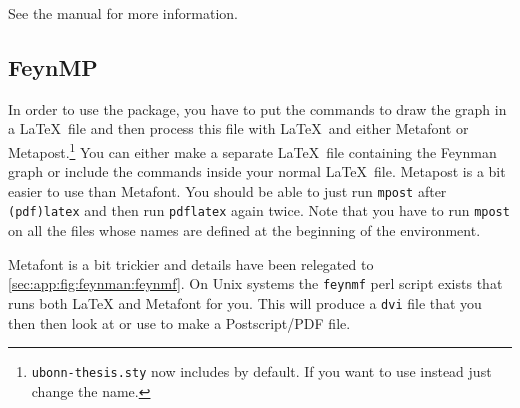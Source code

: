 See the  manual for more information.

\subsection{FeynMP}%
\label{sec:fig:feynman:feynmp}

In order to use the  package, you have to put
the commands to draw the graph in a \LaTeX\ file and then process
this file with \LaTeX\ and either Metafont or
Metapost.\footnote{\texttt{ubonn-thesis.sty} now includes 
  by default.
  If you want to use  instead just change the name.} 
You can either make
a separate \LaTeX\ file containing the Feynman graph or include the
commands inside your normal \LaTeX\ file.
Metapost is a bit easier to use than Metafont.
You should be able to just run
\texttt{mpost} after \texttt{(pdf)latex} and then run %
\texttt{pdflatex} again twice.
Note that you have to run
\texttt{mpost} on all the files whose names are defined at the
beginning of the  environment.

Metafont is a bit trickier and details have been relegated to
\cref{sec:app:fig:feynman:feynmf}. 
On Unix systems the \texttt{feynmf} perl script exists that runs both \LaTeX{} and
Metafont for you. This will produce a \texttt{dvi} file that you then
then look at or use to make a Postscript/PDF file.

